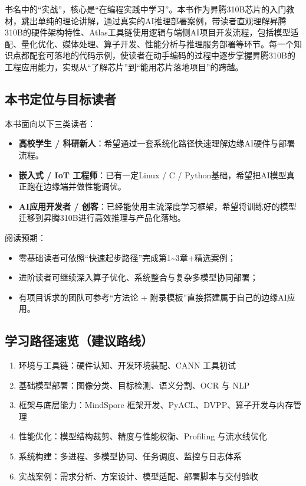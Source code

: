 书名中的``实战''，核心是``在编程实践中学习''。本书作为昇腾310B芯片的入门教材，跳出单纯的理论讲解，通过真实的AI推理部署案例，带读者直观理解昇腾310B的硬件架构特性、Atlas工具链使用逻辑与端侧AI项目开发流程，包括模型适配、量化优化、媒体处理、算子开发、性能分析与推理服务部署等环节。每一个知识点都配套可落地的代码示例，使读者在动手编码的过程中逐步掌握昇腾310B的工程应用能力，实现从``了解芯片''到``能用芯片落地项目''的跨越。

\subsection*{本书定位与目标读者}\label{src-book-README-h1}

本书面向以下三类读者：

\begin{itemize}
\tightlist
\item
  \textbf{高校学生 /
  科研新人}：希望通过一套系统化路径快速理解边缘AI硬件与部署流程。
\item
  \textbf{嵌入式 / IoT 工程师}：已有一定Linux / C /
  Python基础，希望把AI模型真正跑在边缘端并做性能调优。
\item
  \textbf{AI应用开发者 /
  创客}：已经能使用主流深度学习框架，希望将训练好的模型迁移到昇腾310B进行高效推理与产品化落地。
\end{itemize}

阅读预期：

\begin{itemize}
\tightlist
\item
  零基础读者可依照``快速起步路径''完成第1\textasciitilde3章+精选案例；
\item
  进阶读者可继续深入算子优化、系统整合与复杂多模型协同部署；
\item
  有项目诉求的团队可参考``方法论 +
  附录模板''直接搭建属于自己的边缘AI应用。
\end{itemize}

\subsection*{学习路径速览（建议路线）}\label{src-book-README-h2}

\begin{enumerate}
\def\labelenumi{\arabic{enumi}.}
\tightlist
\item
  环境与工具链：硬件认知、开发环境装配、CANN 工具初试
\item
  基础模型部署：图像分类、目标检测、语义分割、OCR 与 NLP
\item
  框架与底层能力：MindSpore 框架开发、PyACL、DVPP、算子开发与内存管理
\item
  性能优化：模型结构裁剪、精度与性能权衡、Profiling 与流水线优化
\item
  系统构建：多进程、多模型协同、任务调度、监控与日志体系
\item
  实战案例：需求分析、方案设计、模型适配、部署脚本与交付验收
\end{enumerate}

